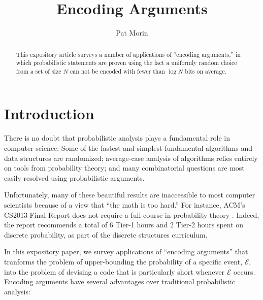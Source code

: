 \documentclass[lotsofwhite]{patmorin}
\title{Encoding Arguments}
\author{Pat Morin}
\date{}
\begin{document}
\begin{titlepage}
\maketitle

\begin{abstract}
This expository article surveys a number of applications of ``encoding
arguments,'' in which probabilistic statements are proven using the fact
a uniformly random choice from a set of size $N$ can not be encoded with
fewer than $\log N$ bits on average.
\end{abstract}


\end{titlepage}
\tableofcontents
\newpage
{}

\section{Introduction}

There is no doubt that probabilistic analysis plays a fundamental role in
computer science: Some of the fastest and simplest fundamental algorithms
and data structures are randomized; average-case analysis of algorithms
relies entirely on tools from probability theory; and many combinatorial
questions are most easily resolved using probabilistic arguments.  

Unfortunately, many of these beautiful results are inaccessible to most
computer scientists because of a view that ``the math is too hard.''
For instance, ACM's CS2013 Final Report does not require a full course
in probability theory \cite[Page~50]{acm2013}. Indeed, the report
recommends a total of 6 Tier-1 hours and 2 Tier-2 hours spent on discrete
probability, as part of the discrete structures curriculum.

In this expository paper, we survey applications of ``encoding arguments''
that tranforms the problem of upper-bounding the probability of a
specific event, $\mathcal{E}$, into the problem of devising a code that
is particularly short whenever $\mathcal{E}$ occurs.  Encoding arguments
have several advantages over traditional probabilistic analysis:
\end{document}
